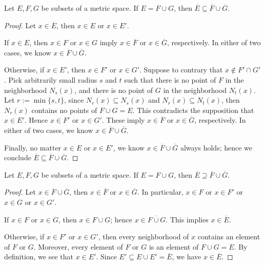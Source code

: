 \begin{Exercise}
	\begin{lemma}\label{lemma:ex_2.7a}
		Let $E,F,G$ be subsets of a metric space. 
		If $E=F\cup G$, then $\overline{E} \subseteq \overline{F}\cup\overline{G}$.
	\end{lemma}
	\begin{proof}
		Let $x\in\overline{E}$, then $x\in E$ or $x\in E'$.
		
		If $x\in E$, then $x\in F$ or $x\in G$ imply $x\in\overline{F}$ or $x\in\overline{G}$, respectively.
		In either of two cases, we know $x\in \overline{F}\cup\overline{G}$.
		
		Otherwise, if $x\in E'$, then $x\in F'$ or $x\in G'$. 
		Suppose to contrary that $x\notin F'\cap G'$.
		Pick arbitrarily small radius $s$ and $t$ such that there is no point of $F$ in the neighborhood $N_s(x)$, and there is no point of $G$ in the neighborhood $N_t(x)$. 
		Let $r := \min\{s,t\}$, since $N_r(x)\subseteq N_s(x)$ and $N_r(x)\subseteq N_t(x)$, then $N_r(x)$ contains no points of $F\cup G = E$. 
		This contradicts the supposition that $x\in E'$. 
		Hence $x\in F'$ or $x\in G'$. 
		These imply $x\in \overline{F}$ or $x\in \overline{G}$, respectively. 
		In either of two cases, we know $x\in \overline{F}\cup \overline{G}$.
		
		Finally, no matter $x\in E$ or $x\in E'$, we know $x\in \overline{F}\cup \overline{G}$ always holds; hence we conclude $\overline{E} \subseteq \overline{F}\cup \overline{G}$.
	\end{proof}
	
	\begin{lemma}\label{lemma:ex_2.7b}
		Let $E,F,G$ be subsets of a metric space. 
		If $E=F\cup G$, then $\overline{E} \supseteq \overline{F}\cup\overline{G}$.
	\end{lemma}
	\begin{proof}
		Let $x\in \overline{F}\cup \overline{G}$, then $x\in \overline{F}$ or $x\in \overline{G}$. 
		In particular, $x\in F$ or $x\in F'$ or $x\in G$ or $x\in G'$.
		
		If $x\in F$ or $x\in G$, then $x\in F\cup G$; hence $x\in \overline{F\cup G}$. This implies $x\in \overline{E}$.
		
		Otherwise, if $x\in F'$ or $x\in G'$, then every neighborhood of $x$ contains an element of $F$ or $G$. 
		Moreover, every element of $F$ or $G$ is an element of $F\cup G = E$. 
		By definition, we see that $x\in E'$. 
		Since $E' \subseteq E\cup E' = \overline{E}$, we have $x\in \overline{E}$.
		

\end{proof}
\end{Exercise}
